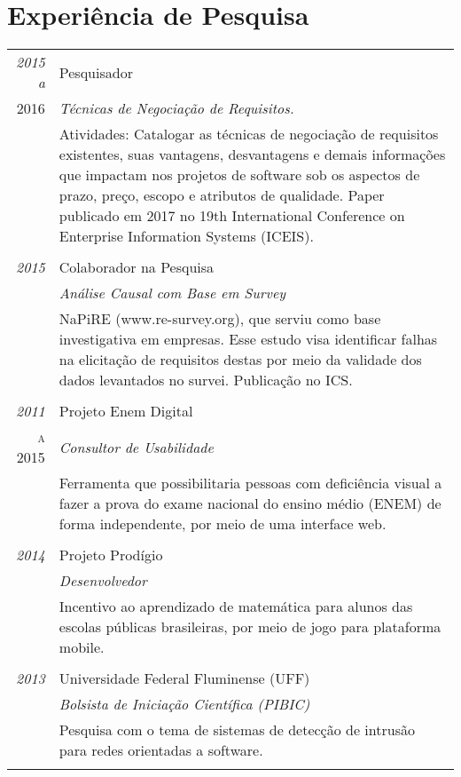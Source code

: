 \documentclass[a4paper,10pt]{article}
\begin{document}
 \section{Experiência de Pesquisa}
\begin{tabular}{r|p{12.5cm}}
 \emph{2015 a} & Pesquisador \\
 \textsc{2016}&\emph{Técnicas de Negociação de Requisitos.}\\
 &\footnotesize{Atividades: Catalogar as técnicas de negociação de requisitos existentes, suas vantagens, desvantagens e demais informações que impactam nos projetos de software sob os aspectos de prazo, preço, escopo e atributos de qualidade. Paper publicado em 2017 no 19th International Conference on Enterprise Information Systems (ICEIS).}\\
 
 & \\
 
 \emph{2015} & Colaborador na Pesquisa \\
 \textsc{}&\emph{Análise Causal com Base em Survey}\\
 &\footnotesize{NaPiRE (www.re-survey.org), que serviu como base investigativa em empresas. Esse estudo visa identificar falhas na elicitação de requisitos destas por meio da validade dos dados levantados no survei. Publicação no ICS.}\\
 
 & \\
 
 \emph{2011} & Projeto Enem Digital \\
 \textsc{a 2015}&\emph{Consultor de Usabilidade}\\
 &\footnotesize{Ferramenta que possibilitaria pessoas com deficiência visual a fazer a prova do exame nacional do ensino médio (ENEM) de forma independente, por meio de uma interface web.}\\
 
 & \\
 
 \emph{2014} & Projeto Prodígio \\
 \textsc{}&\emph{Desenvolvedor}\\
 &\footnotesize{Incentivo ao aprendizado de matemática para alunos das escolas públicas brasileiras, por meio de jogo para plataforma mobile.}\\
 
 & \\
 
 \emph{2013} & Universidade Federal Fluminense (UFF) \\
 \textsc{}&\emph{Bolsista de Iniciação Científica (PIBIC)}\\
 &\footnotesize{Pesquisa com o tema de sistemas de detecção de intrusão para redes orientadas a software. }\\
 
 \multicolumn{2}{c}{} \end{tabular}
\end{document}
